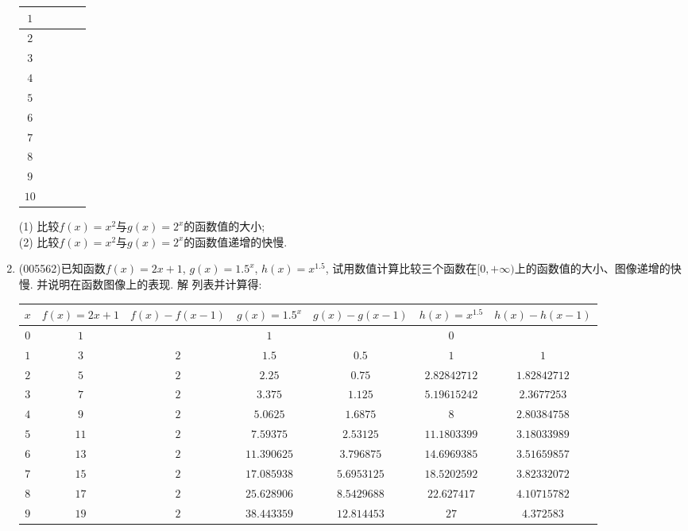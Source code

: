 \documentclass[10pt,a4paper]{article}
\begin{document}
\begin{enumerate}[1.]
\begin{center}
\begin{tabular}{|c|c|c|c|c|}
        $1$ & & & & \\ \hline
        $2$ & & & & \\ \hline
        $3$ & & & & \\ \hline
        $4$ & & & & \\ \hline
        $5$ & & & & \\ \hline
        $6$ & & & & \\ \hline
        $7$ & & & & \\ \hline
        $8$ & & & & \\ \hline
        $9$ & & & & \\ \hline
        $10$ & & & & \\ \hline
    \end{tabular}
\end{center}
(1) 比较$f(x)=x^2$与$g(x)=2^x$的函数值的大小;\\
(2) 比较$f(x)=x^2$与$g(x)=2^x$的函数值递增的快慢.
\item {\tiny (005562)}已知函数$f(x)=2x+1$, $g(x)=1.5^x$, $h(x)=x^{1.5}$, 试用数值计算比较三个函数在$[0,+\infty)$上的函数值的大小、图像递增的快慢. 并说明在函数图像上的表现.
解  列表并计算得:
\begin{center}
    \begin{longtable}{|c|c|c|c|c|c|c|}
        \hline
        $x$	 & $f(x)=2x+1$ & $f(x)-f(x-1)$ & $g(x)=1.5^x$ & $g(x)-g(x-1)$ & $h(x)=x^{1.5}$ & $h(x)-h(x-1)$ \\ \hline
        \endhead
        $0$ & $1$ & & $1$ & & $0$ &  \\ \hline
        $1$ & $3$ & $2$ & $1.5$ & $0.5$ & $1$ & $1$\\ \hline
        $2$ & $5$ & $2$ & $2.25$ & $0.75$ & $2.82842712$ & $1.82842712$\\ \hline
        $3$ & $7$ & $2$ & $3.375$ & $1.125$ & $5.19615242$ & $2.3677253$\\ \hline
        $4$ & $9$ & $2$ & $5.0625$ & $1.6875$ & $8$ & $2.80384758$\\ \hline
        $5$ & $11$ & $2$ & $7.59375$ & $2.53125$ & $11.1803399$ & $3.18033989$\\ \hline
        $6$ & $13$ & $2$ & $11.390625$ & $3.796875$ & $14.6969385$ & $3.51659857$\\ \hline
        $7$ & $15$ & $2$ & $17.085938$ & $5.6953125$ & $18.5202592$ & $3.82332072$\\ \hline
        $8$ & $17$ & $2$ & $25.628906$ & $8.5429688$ & $22.627417$ & $4.10715782$\\ \hline
        $9$ & $19$ & $2$ & $38.443359$ & $12.814453$ & $27$ & $4.372583$\\ \hline

\end{longtable}
\end{center}
\end{enumerate}
\end{document}
